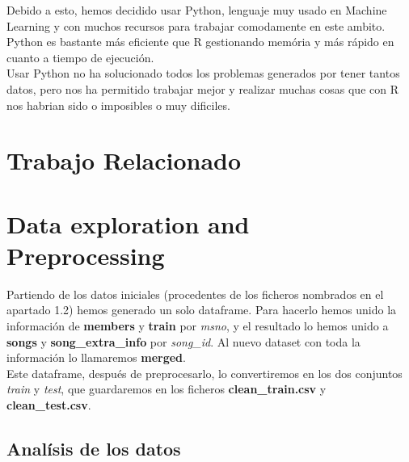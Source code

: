\documentclass[a4paper]{article}
\begin{document}
Debido a esto, hemos decidido usar Python, lenguaje muy usado en Machine Learning y con muchos recursos para trabajar comodamente en este ambito. Python es bastante más eficiente que R gestionando memória y más rápido en cuanto a tiempo de ejecución.\\

Usar Python no ha solucionado todos los problemas generados por tener tantos datos, pero nos ha permitido trabajar mejor y realizar muchas cosas que con R nos habrian sido o imposibles o muy dificiles.

\section{Trabajo Relacionado}




\section{Data exploration and Preprocessing}

Partiendo de los datos iniciales (procedentes de los ficheros nombrados en el apartado 1.2) hemos generado un solo dataframe. Para hacerlo hemos unido la información de \textbf{members} y \textbf{train} por \textit{msno}, y el resultado lo hemos unido a \textbf{songs} y \textbf{song\_extra\_info} por \textit{song\_id}. Al nuevo dataset con toda la información lo llamaremos \textbf{merged}.\\

Este dataframe, después de preprocesarlo, lo convertiremos en los dos conjuntos \textit{train} y \textit{test}, que guardaremos en los ficheros \textbf{clean\_train.csv} y \textbf{clean\_test.csv}.

\subsection{Analísis de los datos}
\end{document}
